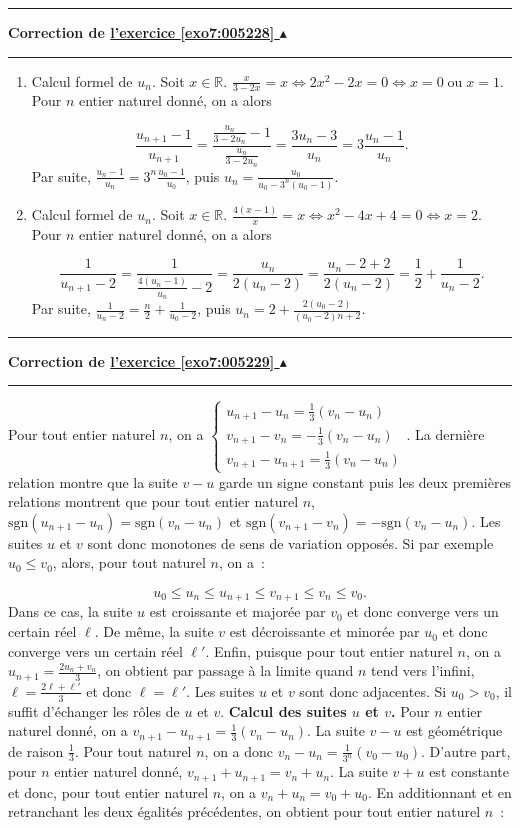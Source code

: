 \documentclass[11pt,a4paper]{article}
\newcommand{\Rr}{\mathbb{R}} \newcommand{\R}{\mathbb{R}}
\newcounter{exo}
\newcommand{\correction}[1]{\hypertarget{cor7:#1}{}\label{cor7:#1}{\bf Correction de \hyperlink{exo7:#1}{l'exercice \ref{exo7:#1} $\blacktriangle$}}\vspace{1mm}\hrule\vspace{1mm}}
\newcommand{\fincorrection}{\vspace{1mm}\hrule\vspace*{7mm}}
\begin{document}
\fincorrection
\correction{005228}
\begin{enumerate}
 \item  Calcul formel de $u_n$.
Soit $x\in\Rr$. $\frac{x}{3-2x}=x\Leftrightarrow2x^2-2x=0\Leftrightarrow x=0\;\mbox{ou}\;x=1$. Pour $n$ entier naturel donné, on a alors

$$\frac{u_{n+1}-1}{u_{n+1}}=\frac{\frac{u_n}{3-2u_n}-1}{\frac{u_n}{3-2u_n}}=\frac{3u_n-3}{u_n}
=3\frac{u_n-1}{u_n}.$$
Par suite, $\frac{u_n-1}{u_n}=3^n\frac{u_0-1}{u_0}$, puis $u_n=\frac{u_0}{u_0-3^n(u_0-1)}$.
 \item   Calcul formel de $u_n$.
Soit $x\in\Rr$. $\frac{4(x-1)}{x}=x\Leftrightarrow x^2-4x+4=0\Leftrightarrow x=2$. Pour $n$ entier naturel donné, on a alors

$$\frac{1}{u_{n+1}-2}=\frac{1}{\frac{4(u_n-1)}{u_n}-2}=\frac{u_n}{2(u_n-2)}=\frac{u_n-2+2}{2(u_n-2)}=\frac{1}{2}+\frac{1}{u_n-2}.$$
Par suite, $\frac{1}{u_n-2}=\frac{n}{2}+\frac{1}{u_0-2}$, puis $u_n=2+\frac{2(u_0-2)}{(u_0-2)n+2}$.
\end{enumerate}
\fincorrection
\correction{005229}

Pour tout entier naturel $n$, on a $\left\{
\begin{array}{l}
u_{n+1}-u_n=\frac{1}{3}(v_n-u_n)\\
v_{n+1}-v_n=-\frac{1}{3}(v_n-u_n)\\
v_{n+1}-u_{n+1}=\frac{1}{3}(v_n-u_n)
\end{array}
\right.$.
La dernière relation montre que la suite $v-u$ garde un signe constant puis les deux premières relations montrent que pour tout entier naturel $n$, $\mbox{sgn}(u_{n+1}-u_n)=\mbox{sgn}(v_n-u_n)$ et 
$\mbox{sgn}(v_{n+1}-v_n)=-\mbox{sgn}(v_n-u_n)$. Les suites $u$ et $v$ sont donc monotones de sens de variation opposés.
Si par exemple $u_0\leq v_0$, alors, pour tout naturel $n$, on a~:

$$u_0\leq u_n\leq u_{n+1}\leq v_{n+1}\leq v_n\leq v_0.$$
Dans ce cas, la suite $u$ est croissante et majorée par $v_0$ et donc converge vers un certain réel $\ell$. De même, la suite $v$ est décroissante et minorée par $u_0$ et donc converge vers un certain réel $\ell'$. Enfin, puisque pour tout entier naturel $n$, on a $u_{n+1}=\frac{2u_n+v_n}{3}$, on obtient par passage à la limite quand $n$ tend vers l'infini,  $\ell=\frac{2\ell+\ell'}{3}$ et donc $\ell=\ell'$. Les suites $u$ et $v$ sont donc adjacentes. Si $u_0>v_0$, il suffit d'échanger les rôles de $u$ et $v$.
\textbf{Calcul des suites $u$ et $v$.}
Pour $n$ entier naturel donné, on a $v_{n+1}-u_{n+1}=\frac{1}{3}(v_n-u_n)$. La suite $v-u$ est géométrique de raison $\frac{1}{3}$. Pour tout naturel $n$, on a donc $v_n-u_n=\frac{1}{3^n}(v_0-u_0)$.
D'autre part, pour $n$ entier naturel donné, $v_{n+1}+u_{n+1}=v_n+u_n$. La suite $v+u$ est constante et donc, pour tout entier naturel $n$, on a $v_n+u_n=v_0+u_0$.
En additionnant et en retranchant les deux égalités précédentes, on obtient pour tout entier naturel $n$~:
\end{document}
